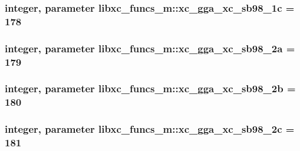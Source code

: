 \hypertarget{classlibxc__funcs__m_a6f9106be4a5b0c87db81f256f493c553}{
\subsubsection[{xc\-\_\-gga\-\_\-xc\-\_\-sb98\-\_\-1c}]{\setlength{\rightskip}{0pt plus 5cm}integer, parameter libxc\-\_\-funcs\-\_\-m\-::xc\-\_\-gga\-\_\-xc\-\_\-sb98\-\_\-1c = 178}}\label{classlibxc__funcs__m_a6f9106be4a5b0c87db81f256f493c553}
\hypertarget{classlibxc__funcs__m_aaf05c9feb7e4beab8cc92011ed1b9643}{
\subsubsection[{xc\-\_\-gga\-\_\-xc\-\_\-sb98\-\_\-2a}]{\setlength{\rightskip}{0pt plus 5cm}integer, parameter libxc\-\_\-funcs\-\_\-m\-::xc\-\_\-gga\-\_\-xc\-\_\-sb98\-\_\-2a = 179}}\label{classlibxc__funcs__m_aaf05c9feb7e4beab8cc92011ed1b9643}
\hypertarget{classlibxc__funcs__m_a63bde89a0f2e57d874e29eab34ff2ea3}{
\subsubsection[{xc\-\_\-gga\-\_\-xc\-\_\-sb98\-\_\-2b}]{\setlength{\rightskip}{0pt plus 5cm}integer, parameter libxc\-\_\-funcs\-\_\-m\-::xc\-\_\-gga\-\_\-xc\-\_\-sb98\-\_\-2b = 180}}\label{classlibxc__funcs__m_a63bde89a0f2e57d874e29eab34ff2ea3}
\hypertarget{classlibxc__funcs__m_a043acb3ab7c5822422a4d3604384adb8}{
\subsubsection[{xc\-\_\-gga\-\_\-xc\-\_\-sb98\-\_\-2c}]{\setlength{\rightskip}{0pt plus 5cm}integer, parameter libxc\-\_\-funcs\-\_\-m\-::xc\-\_\-gga\-\_\-xc\-\_\-sb98\-\_\-2c = 181}}\label{classlibxc__funcs__m_a043acb3ab7c5822422a4d3604384adb8}

